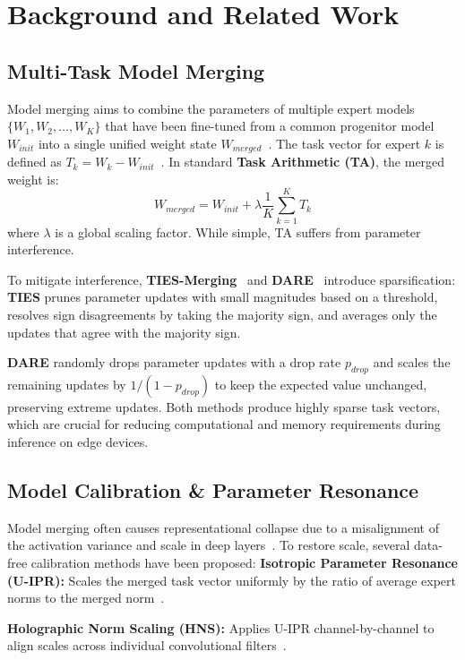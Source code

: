 \documentclass{article}
\theoremstyle{plain}
\theoremstyle{definition}
\theoremstyle{remark}
\begin{document}
\section{Background and Related Work}
\label{sec:related}

\subsection{Multi-Task Model Merging}
Model merging aims to combine the parameters of multiple expert models $\{W_1, W_2, \dots, W_K\}$ that have been fine-tuned from a common progenitor model $W_{init}$ into a single unified weight state $W_{merged}$~\cite{wortsman22wa, choshen23fusing}. The task vector for expert $k$ is defined as $T_k = W_k - W_{init}$~\cite{ilharco22task}.
In standard \textbf{Task Arithmetic (TA)}, the merged weight is:
\begin{equation}
    W_{merged} = W_{init} + \lambda \frac{1}{K} \sum_{k=1}^K T_k
\end{equation}
where $\lambda$ is a global scaling factor. While simple, TA suffers from parameter interference.

To mitigate interference, \textbf{TIES-Merging}~\cite{yadav23ties} and \textbf{DARE}~\cite{yu23dare} introduce sparsification:
\textbf{TIES} prunes parameter updates with small magnitudes based on a threshold, resolves sign disagreements by taking the majority sign, and averages only the updates that agree with the majority sign.

\textbf{DARE} randomly drops parameter updates with a drop rate $p_{drop}$ and scales the remaining updates by $1/(1-p_{drop})$ to keep the expected value unchanged, preserving extreme updates.
Both methods produce highly sparse task vectors, which are crucial for reducing computational and memory requirements during inference on edge devices.

\subsection{Model Calibration \& Parameter Resonance}
Model merging often causes representational collapse due to a misalignment of the activation variance and scale in deep layers~\cite{ortiz23parameter}. To restore scale, several data-free calibration methods have been proposed:
\textbf{Isotropic Parameter Resonance (U-IPR):} Scales the merged task vector uniformly by the ratio of average expert norms to the merged norm~\cite{ortiz23parameter}.

\textbf{Holographic Norm Scaling (HNS):} Applies U-IPR channel-by-channel to align scales across individual convolutional filters~\cite{ortiz23parameter}.
\end{document}
